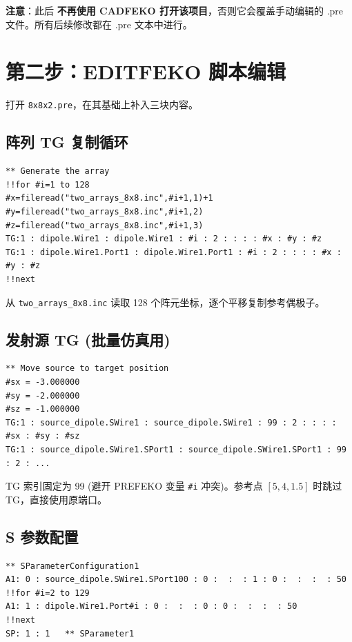 \documentclass[12pt,a4paper]{ctexart}
\begin{document}
\textbf{注意}：此后 \textbf{不再使用 CADFEKO 打开该项目}，否则它会覆盖手动编辑的 .pre 文件。所有后续修改都在 .pre 文本中进行。

\section{第二步：EDITFEKO 脚本编辑}

打开 \texttt{8x8x2.pre}，在其基础上补入三块内容。

\subsection{阵列 TG 复制循环}

\begin{lstlisting}
** Generate the array
!!for #i=1 to 128
#x=fileread("two_arrays_8x8.inc",#i+1,1)+1
#y=fileread("two_arrays_8x8.inc",#i+1,2)
#z=fileread("two_arrays_8x8.inc",#i+1,3)
TG:1 : dipole.Wire1 : dipole.Wire1 : #i : 2 : : : : #x : #y : #z
TG:1 : dipole.Wire1.Port1 : dipole.Wire1.Port1 : #i : 2 : : : : #x : #y : #z
!!next
\end{lstlisting}

从 \texttt{two\_arrays\_8x8.inc} 读取 128 个阵元坐标，逐个平移复制参考偶极子。

\subsection{发射源 TG (批量仿真用)}

\begin{lstlisting}
** Move source to target position
#sx = -3.000000
#sy = -2.000000
#sz = -1.000000
TG:1 : source_dipole.SWire1 : source_dipole.SWire1 : 99 : 2 : : : : #sx : #sy : #sz
TG:1 : source_dipole.SWire1.SPort1 : source_dipole.SWire1.SPort1 : 99 : 2 : ...
\end{lstlisting}

TG 索引固定为 99 (避开 PREFEKO 变量 \texttt{\#i} 冲突)。参考点 $[5,4,1.5]$ 时跳过 TG，直接使用原端口。

\subsection{S 参数配置}

\begin{lstlisting}
** SParameterConfiguration1
A1: 0 : source_dipole.SWire1.SPort100 : 0 :  :  : 1 : 0 :  :  :  : 50
!!for #i=2 to 129
A1: 1 : dipole.Wire1.Port#i : 0 :  :  : 0 : 0 :  :  :  : 50
!!next
SP: 1 : 1   ** SParameter1
\end{lstlisting}
\end{document}
